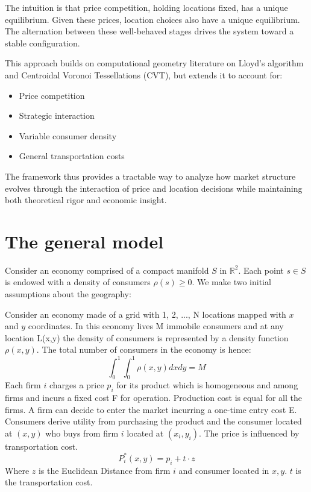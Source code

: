The intuition is that price competition, holding locations fixed, has a unique equilibrium. Given these prices, location choices also have a unique equilibrium. The alternation between these well-behaved stages drives the system toward a stable configuration.

This approach builds on computational geometry literature on Lloyd's algorithm and Centroidal Voronoi Tessellations (CVT), but extends it to account for:
\begin{itemize}
    \item Price competition
    \item Strategic interaction
    \item Variable consumer density
    \item General transportation costs
\end{itemize}

The framework thus provides a tractable way to analyze how market structure evolves through the interaction of price and location decisions while maintaining both theoretical rigor and economic insight.


\section{The general model}
Consider an economy comprised of a compact manifold $S$ in $\mathbb{R}^2$. Each point $s \in S$ is endowed with a density of consumers $\rho(s) \geq 0$. We make two initial assumptions about the geography:

Consider an economy made of a grid with 1, 2, ..., N locations mapped with $x$ and $y$ coordinates.
In this economy lives M immobile consumers and at any location L(x,y) the density of consumers is represented by a density function $\rho(x,y)$.
The total number of consumers in the economy is hence:
\begin{equation}
\int_0^1 \int_0^1 \rho(x, y) d x d y=M
\end{equation}
Each firm $i$ charges a price $p_i$ for its product which is homogeneous and among firms and incurs a fixed cost F for operation. Production cost is equal for all the firms. A firm can decide to enter the market incurring a one-time entry cost E.
Consumers derive utility from purchasing the product and the consumer located at $(x,y)$ who buys from firm $i$ located at $(x_i,y_i)$. The price is influenced by transportation cost.
\begin{equation}
P^*_i(x,y)=p_i+t \cdot z
\end{equation}
Where $z$ is the Euclidean Distance from firm $i$ and consumer located in $x,y$. $t$ is the transportation cost.

